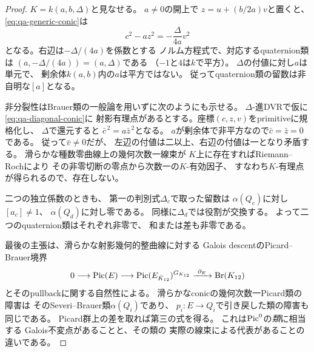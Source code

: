 \begin{proof}
$K=k(a,b,\Delta)$と見なせる。
$a\ne0$の開上で
$z=u+(b/2a)v$と置くと、
\eqref{eq:qa-generic-conic}は
\[
 c^2-a z^2=-\frac{\Delta}{4a}v^2
 \tag{Diagonal-conic}\label{eq:qa-diagonal-conic}
\]
となる。右辺は$-\Delta/(4a)$を係数とする
ノルム方程式で、対応するquaternion類は
$(a,-\Delta/(4a))=(a,\Delta)$である
（$-1$と$4$は$k$で平方）。
$\Delta$の付値に対し$a$は単元で、
剰余体$k(a,b)$内の$a$は平方ではない。
従ってquaternion類の留数は非自明な$[a]$となる。

非分裂性はBrauer類の一般論を用いずに次のようにも示せる。
$\Delta$-進DVRで仮に\eqref{eq:qa-diagonal-conic}に
射影有理点があるとする。座標$(c,z,v)$をprimitiveに規格化し、
$\Delta$で還元すると
$\bar c^{\,2}=a\bar z^{\,2}$となる。
$a$が剰余体で非平方なので$\bar c=\bar z=0$である。
従って$\bar v\ne0$だが、
左辺の付値は二以上、右辺の付値は一となり矛盾する。
滑らかな種数零曲線上の幾何次数一線束が
$K$上に存在すればRiemann--Rochにより
その非零切断の零点から次数一の$K$-有効因子、
すなわち$K$-有理点が得られるので、存在しない。

二つの独立係数のときも、
第一の判別式$\Delta_c$で取った留数は
$\alpha(Q_c)$に対し$[a_c]\ne1$、
$\alpha(Q_d)$に対し零である。
同様に$\Delta_d$では役割が交換する。
よって二つのquaternion類はそれぞれ非零で、
和または差も非零である。

最後の主張は、滑らかな射影幾何的整曲線に対する
Galois descentのPicard--Brauer境界
\[
 0\longrightarrow\operatorname{Pic}(E)
 \longrightarrow\operatorname{Pic}(E_{\bar K_{12}})^{G_{K_{12}}}
 \xrightarrow{\ \partial_E\ }\operatorname{Br}(K_{12})
\]
とそのpullbackに関する自然性による。
滑らかなconicの幾何次数一Picard類の障害は
そのSeveri--Brauer類$\alpha(Q_i)$であり、
$p_i:E\to Q_i$で引き戻した類の障害も同じである。
Picard群上の差を取れば第三の式を得る。
これは$\operatorname{Pic}^0$の\emph{類}に相当する
Galois不変点があることと、その類の
実際の線束による代表があることの違いである。
\end{proof}

